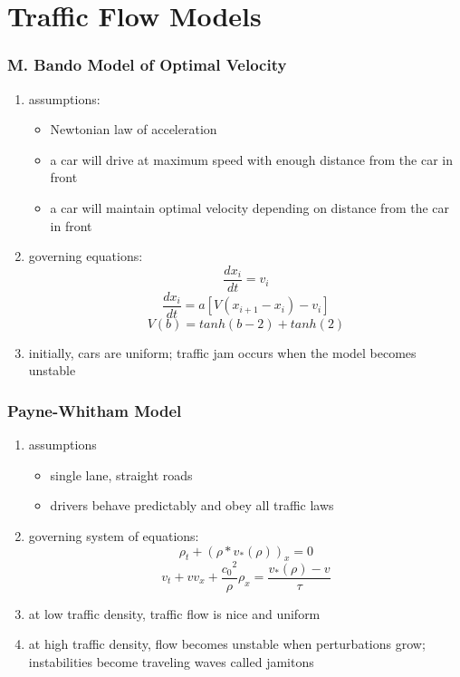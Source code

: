 \documentclass[compress,handout,10pt]{beamer}
\let\olditem\item
\renewcommand{\item}{\setlength{\itemsep}{0.5\baselineskip}\olditem}
\begin{document}
\section{Traffic Flow Models}
\begin{frame}
    \frametitle{M. Bando Model of Optimal Velocity}
     \begin{enumerate}
	\item assumptions:
		\begin{itemize}
			\item Newtonian law of acceleration
			\item a car will drive at maximum speed with enough distance from the car in front
			\item a car will maintain optimal velocity depending on distance from the car in front
		\end{itemize}
	\item governing equations:
	\[
	\frac{dx_i}{dt} = v_i
	\]
	\[
	\frac{dx_i}{dt} = a[V(x_{i+1} - x_i) - v_i]
	\]
	\[
	V(b) = tanh(b-2) + tanh(2)
	\]
	\item initially, cars are uniform; traffic jam occurs when the model becomes unstable
     \end{enumerate}
\end{frame}

\begin{frame}
    \frametitle{Payne-Whitham Model}
     \begin{enumerate}
	\item assumptions
	\begin{itemize}
		\item single lane, straight roads
		\item drivers behave predictably and obey all traffic laws
	\end{itemize}
	\item governing system of equations:
	\[
	\rho_t + (\rho*v_*(\rho))_x = 0 
	\]
	\[
	v_t + vv_x + \frac{{c_0}^2}{\rho}\rho_x = \frac{v_*(\rho) - v}{\tau}
	\]
	\item at low traffic density, traffic flow is nice and uniform
	\item at high traffic density, flow becomes unstable when perturbations grow; instabilities become traveling waves called jamitons
     \end{enumerate}
\end{frame}
\end{document}
